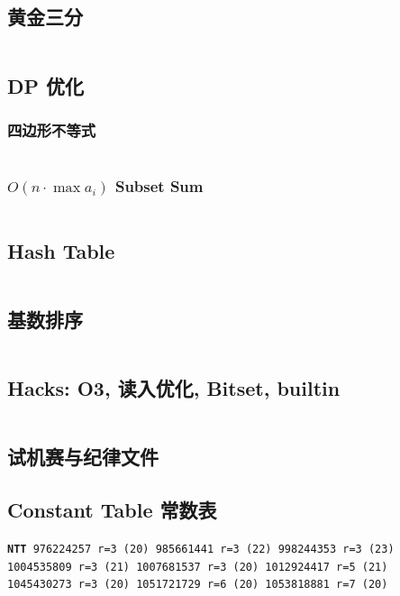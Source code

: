 \documentclass[titlepage, a4paper, 11pt]{article}
\begin{document}
\begin{spacing}{1.15}
				\subsection{黄金三分}
					\inputminted[highlightlines={7}]{cpp}{src/yzh/golden_ternary.cpp}
				\subsection{DP 优化}
				\subsubsection{四边形不等式}
					\inputminted{cpp}{src/Miscellany/2D1D.cpp}
					
				\subsubsection{$O(n \cdot \max a_i)$ Subset Sum}
					\inputminted{cpp}{src/yzh/Subset Sum.cpp}

				\newpage
				\subsection{Hash Table}
					\inputminted[highlightlines={4,15,17,18}]{cpp}{src/DataStructure/hashmap.cpp}
				\subsection{基数排序}
					\inputminted{cpp}{src/Miscellany/RadixSort.cpp}
				\subsection{Hacks: O3, 读入优化, Bitset, builtin}
					\inputminted{cpp}{src/Miscellany/hack.cpp}
				\subsection{试机赛与纪律文件}
				\begin{spacing}{0.3}
					
				\end{spacing}
				\subsection{Constant Table 常数表}
				\label{randomprimes}
				\begin{small}
					\setlength{\parindent}{0em}\setlength{\parskip}{0em}\renewcommand{\baselinestretch}{.8}
					\texttt{\textbf{NTT} 976224257 r=3 (20)
					985661441 r=3 (22)
					998244353 r=3 (23)\\
					1004535809 r=3 (21)
					1007681537 r=3 (20)
					1012924417 r=5 (21)\\
					1045430273 r=3 (20)
					1051721729 r=6 (20)
					1053818881 r=7 (20)				
					}
				\end{small}
				

\end{spacing}
\end{document}
